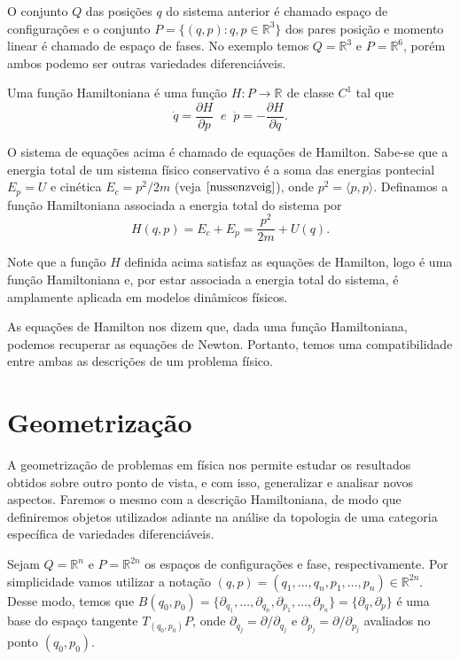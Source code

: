 \documentclass[12pt]{book}
\newcommand{\derivadaparcial}[2]{\frac{\partial #1}{\partial #2}}
\newcommand{\produtointerno}[2]{\langle #1, #2 \rangle}
\newcommand{\real}[1]{\mathbb{R}^{#1}}
\newcommand{\reta}{\real{}}
\begin{document}
	O conjunto $Q$ das posições $q$ do sistema anterior é chamado espaço de configurações e o conjunto $P=\{(q,p): q,p\in \real{3}\}$ dos pares posição e momento linear é chamado de espaço de fases. No exemplo temos $Q=\real{3}$ e $P = \real{6}$, porém ambos podemo ser outras variedades diferenciáveis.
	
	Uma função Hamiltoniana é uma função $H:P \to \reta$ de classe $C^{1}$ tal que 
	$$
	\dot{q} = \derivadaparcial{H}{p} \;\; e \;\; \dot{p} = -\derivadaparcial{H}{q}.
	$$
	
	O sistema de equações acima é chamado de equações de Hamilton. Sabe-se que a energia total de um sistema físico conservativo é a soma das energias pontecial $E_{p} = U$ e cinética $E_{c} = p^{2}/2m$ (veja $\cite{nussenzveig}$), onde $p^{2} = \produtointerno{p}{p}$. Definamos a função Hamiltoniana associada a energia total do sistema por
	$$
	H(q,p) = E_{c} +E_{p} = \frac{p^{2}}{2m}+U(q). 
	$$
	
	Note que a função $H$ definida acima satisfaz as equações de Hamilton, logo é uma função Hamiltoniana e, por estar associada a energia total do sistema, é amplamente aplicada em modelos dinâmicos físicos.
	
	As equações de Hamilton nos dizem que, dada uma função Hamiltoniana, podemos recuperar as equações de Newton. Portanto, temos uma compatibilidade entre ambas as descrições de um problema físico.
	
	\section{Geometrização}
	
	A geometrização de problemas em física nos permite estudar os resultados obtidos sobre outro ponto de vista, e com isso, generalizar e analisar novos aspectos. Faremos o mesmo com a descrição Hamiltoniana, de modo que definiremos objetos utilizados adiante na análise da topologia de uma categoria específica de variedades diferenciáveis.
	
	Sejam $Q= \real{n}$ e $P=\real{2n}$ os espaços de configurações e fase, respectivamente. Por simplicidade vamos utilizar a notação $(q, p ) = (q_{1}, \dots ,q_{n}, p_{1}, \dots ,p_{n}) \in \real{2n}$. Desse modo,  temos que $B(q_{0}, p_{0})=\{\partial_{q_{1}}, \dots, \partial_{q_{n}}, \partial_{p_{1}}, \dots, \partial_{p_{n}}\}= \{\partial_{q}, \partial_{p}\} $ é uma base do espaço tangente $T_{(q_{0},p_{0})} P $, onde $\partial_{q_{j}} = \partial/\partial_{q_{j}}$ e $\partial_{p_{j}} = \partial/\partial_{p_{j}}$ avaliados no ponto $(q_{0}, p_{0})$. 
	
\end{document}
